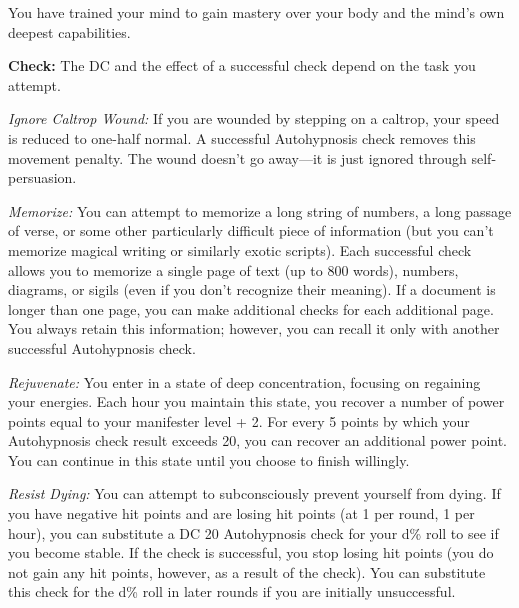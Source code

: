 You have trained your mind to gain mastery over your body and the mind's own deepest capabilities.

\textbf{Check:} The DC and the effect of a successful check depend on the task you attempt.


\textit{Ignore Caltrop Wound:} If you are wounded by stepping on a caltrop, your speed is reduced to one-half normal. A successful Autohypnosis check removes this movement penalty. The wound doesn't go away---it is just ignored through self-persuasion.

\textit{Memorize:} You can attempt to memorize a long string of numbers, a long passage of verse, or some other particularly difficult piece of information (but you can't memorize magical writing or similarly exotic scripts). Each successful check allows you to memorize a single page of text (up to 800 words), numbers, diagrams, or sigils (even if you don't recognize their meaning). If a document is longer than one page, you can make additional checks for each additional page. You always retain this information; however, you can recall it only with another successful Autohypnosis check.

\textit{Rejuvenate:} You enter in a state of deep concentration, focusing on regaining your energies. Each hour you maintain this state, you recover a number of power points equal to your manifester level + 2. For every 5 points by which your Autohypnosis check result exceeds 20, you can recover an additional power point. You can continue in this state until you choose to finish willingly.

\textit{Resist Dying:} You can attempt to subconsciously prevent yourself from dying. If you have negative hit points and are losing hit points (at 1 per round, 1 per hour), you can substitute a DC 20 Autohypnosis check for your d\% roll to see if you become stable. If the check is successful, you stop losing hit points (you do not gain any hit points, however, as a result of the check). You can substitute this check for the d\% roll in later rounds if you are initially unsuccessful.

